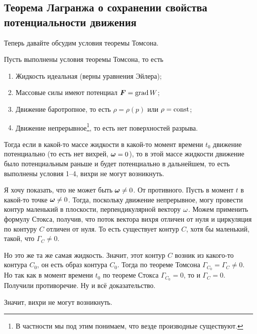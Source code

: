 \subsection{Теорема Лагранжа о сохранении свойства потенциальности движения}
Теперь давайте обсудим условия теоремы Томсона.
\begin{The}
 Пусть выполнены условия теоремы Томсона, то есть 
\begin{enumerate}
  \item Жидкость идеальная (верны уравнения Эйлера);
  \item Массовые силы имеют потенциал $\boldsymbol{F} = \operatorname{grad} W$;
  \item Движение баротропное, то есть $\rho = \rho(p)$ или $\rho = \operatorname{const}$;
  \item Движение непрерывное\footnote{В частности мы под этим понимаем, что везде производные существуют.}, то есть нет поверхностей разрыва.
 \end{enumerate}
Тогда если в какой-то массе жидкости в какой-то момент времени $t_0$ движение потенциально (то есть нет вихрей, $\boldsymbol{\omega}=0$), то в этой массе жидкости движение было потенциальным раньше и будет потенциально в дальнейшем, то есть выполнены условия 1--4, вихри не могут возникнуть.
\end{The}
\begin{Proof}
 Я хочу показать, что не может быть $\boldsymbol{\omega}\ne0$. 
От противного. Пусть в момент $t$ в какой-то точке $\boldsymbol{\omega}\ne0$. Тогда, поскольку движение непрерывное, могу провести контур маленький в плоскости, перпендикулярной вектору $\omega$. Можем применить формулу Стокса, получив, что поток вектора вихря отличен от нуля и циркуляция по контуру $C$ отличен от нуля. То есть существует контур $C$, хотя бы маленький, такой, что $\Gamma_C\ne0$.

Но это же та же самая жидкость. Значит, этот контур $C$ возник из какого-то контура $C_0$, он есть образ контура $C_0$. Тогда по теореме Томсона $\Gamma_{C_0} = \Gamma_C\ne0$. Но так как в момент времени $t_0$ по теореме Стокса $\Gamma_{C_0} = 0$, то и $\Gamma_C=0$. Получили противоречие. Ну и всё доказательство.
\end{Proof}

Значит, вихри не могут возникнуть.

